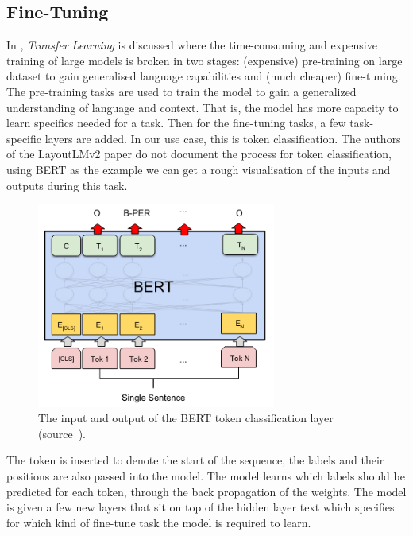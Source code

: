 \subsection{Fine-Tuning}
In , \emph{Transfer Learning} is discussed where the time-consuming and expensive
training of large models is broken in two stages:
(expensive) pre-training on large dataset to gain generalised language capabilities and (much cheaper) fine-tuning.\\
The pre-training tasks are used to train the model to gain a generalized understanding of language and context. That is,
the model has more capacity to learn specifics needed for a task.
\bigbreak
Then for the fine-tuning tasks, a few task-specific layers are added. In our use case, this is token classification.
The authors of the LayoutLMv2 paper do not document the process for token classification, using BERT as the
example we can get a rough visualisation of the inputs and outputs during this task.
\begin{figure}[H]
	\centering
	\includegraphics[width=0.7\textwidth]{figures/bert_token_classification.png}
	\caption{The input and output of the BERT token classification layer (source~\autocite{devlinBERTPretrainingDeep2019}).}
	\label{fig:token_classification_bert}
\end{figure}
The \code{[CLS]} token is inserted to denote the start of the sequence, the labels and their positions are also passed into the model.
The model learns which labels should be predicted for each token, through the back propagation of the weights. The model is given
a few new layers that sit on top of the hidden layer text which specifies for which kind of fine-tune task the model is required
to learn.


